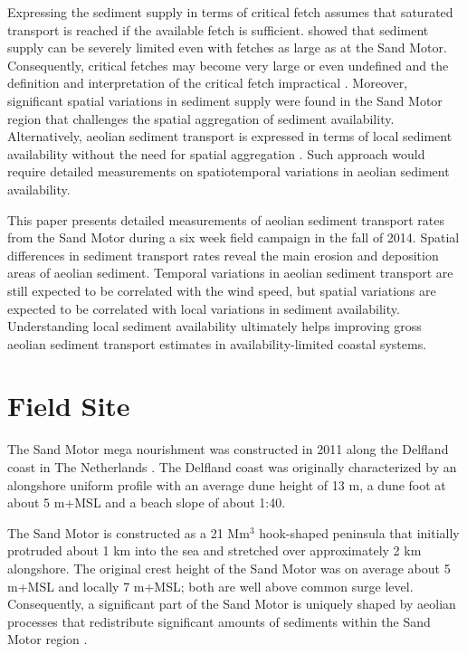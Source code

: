 Expressing the sediment supply in terms of critical fetch assumes that
saturated transport is reached if the available fetch is
sufficient. \citet{Hoonhout2017a} showed that sediment supply can be
severely limited even with fetches as large as at the Sand
Motor. Consequently, critical fetches may become very large or even
undefined and the definition and interpretation of the critical fetch
impractical \citep{Lynch2016, deVries2014b}. Moreover, significant
spatial variations in sediment supply were found in the Sand Motor
region that challenges the spatial aggregation of sediment
availability. Alternatively, aeolian sediment transport is expressed
in terms of local sediment availability without the need for spatial
aggregation \citep{deVries2014a, Hoonhout2016}. Such approach would
require detailed measurements on spatiotemporal variations in aeolian
sediment availability.

This paper presents detailed measurements of aeolian sediment
transport rates from the Sand Motor during a six week field campaign
in the fall of 2014. Spatial differences in sediment transport rates
reveal the main erosion and deposition areas of aeolian
sediment. Temporal variations in aeolian sediment transport are still
expected to be correlated with the wind speed, but spatial variations
are expected to be correlated with local variations in sediment
availability. Understanding local sediment availability ultimately
helps improving gross aeolian sediment transport estimates in
availability-limited coastal systems.

\section{Field Site}
\label{sec:fieldsite2}

The Sand Motor mega nourishment was constructed in 2011 along the
Delfland coast in The Netherlands \citep[Figure
\ref{fig:fieldsite2},][]{Stive2013}.  The Delfland coast was originally
characterized by an alongshore uniform profile with an average dune
height of 13 m, a dune foot at about 5 m+MSL and a beach slope of
about 1:40.

The Sand Motor is constructed as a 21 $\mathrm{Mm^3}$ hook-shaped
peninsula that initially protruded about 1 km into the sea and
stretched over approximately 2 km alongshore. The original crest
height of the Sand Motor was on average about 5 m+MSL and locally 7
m+MSL; both are well above common surge level. Consequently, a
significant part of the Sand Motor is uniquely shaped by aeolian
processes that redistribute significant amounts of sediments within
the Sand Motor region \citep{Hoonhout2017a}.


